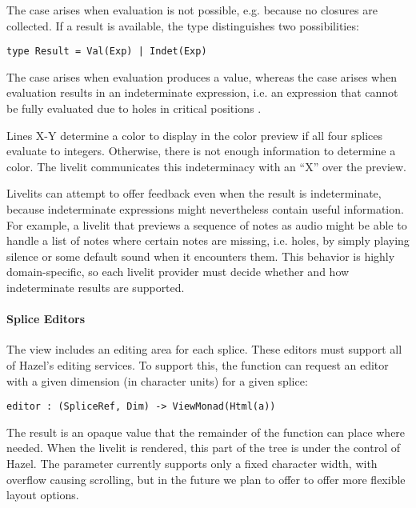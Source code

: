 
The  case 
arises when evaluation is not possible, e.g. because no closures are collected.
If a result is available, the  type distinguishes two possibilities:
\begin{lstlisting}[numbers=none]
type Result = Val(Exp) | Indet(Exp)
\end{lstlisting}
The  case arises when evaluation produces a value, whereas the 
 case arises when evaluation results in an indeterminate expression,
i.e. an expression that cannot be fully evaluated due to holes 
in critical positions \cite{HazelnutLive}.

Lines X-Y determine a color to display in the color preview 
if all four splices evaluate to integers. Otherwise, there is not 
enough information to determine a color. The livelit 
communicates this indeterminacy with an ``X'' over the preview.

Livelits can attempt to offer feedback even when the result is indeterminate,
because indeterminate expressions might nevertheless contain useful information.
For example, a livelit that previews a sequence of notes as audio might be able 
to handle a list of notes where certain notes are missing, i.e. holes, by 
simply playing silence or some default sound when it encounters them.
This behavior is highly domain-specific, so each livelit provider must decide 
whether and how indeterminate results are supported.

\paragraph{Splice Editors}
The view includes an editing area for each splice. These editors must support all of 
Hazel's editing services. To support this, the  function
can request an editor with a given dimension (in character units) for a given splice:
\begin{lstlisting}[numbers=none]
editor : (SpliceRef, Dim) -> ViewMonad(Html(a))
\end{lstlisting}
The result is an opaque  value that the remainder of the function 
can place where needed. When the livelit is rendered, this part of the tree is 
under the control of Hazel. The  parameter currently supports only a fixed
character width, with overflow causing scrolling, but in the future we plan to offer 
to offer more flexible layout options.

